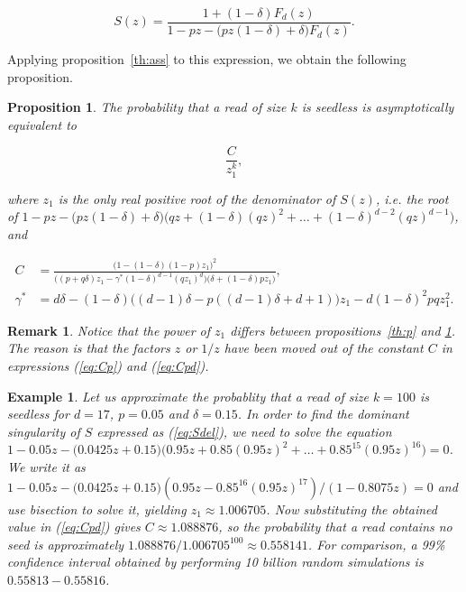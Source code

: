 \documentclass{article}
\newtheorem{example}{Example}
\newtheorem{proposition}{Proposition}
\newtheorem{remark}{Remark}
\begin{document}
\begin{equation}
\label{eq:Sdel}
S(z) = \frac{1+(1-\delta)F_d(z)}
  {1-pz - \big(pz(1-\delta) + \delta\big)F_d(z)}.
\end{equation}

Applying proposition~\ref{th:ass} to this expression, we obtain the
following proposition.

\begin{proposition}
\label{th:pd}
The probability that a read of size $k$ is seedless is asymptotically
equivalent to

\begin{equation*}
\frac{C}{z_1^k},
\end{equation*}

\noindent
where $z_1$ is the only real positive root of the denominator of $S(z)$,
\textit{i.e.} the root of $1-pz - \big(pz(1-\delta) +
\delta\big)\big(qz+(1-\delta)(qz)^2 + \ldots +
(1-\delta)^{d-2}(qz)^{d-1}\big)$, and

\begin{equation}
\label{eq:Cpd}
\begin{split}
C &=
\frac{ \big(1-(1-\delta)(1-p)z_1\big)^2 }
{ \big((p+q\delta)z_1  -\gamma^*(1-\delta)^{d-1}(qz_1)^d \big)
\big(\delta+(1-\delta)pz_1\big) }, \\
\gamma^* &= d\delta -(1-\delta)\big((d-1)\delta-p((d-1)\delta+d+1)\big)z_1
- d(1-\delta)^2pqz_1^2.
\end{split}
\end{equation}
\end{proposition}

\begin{remark}
Notice that the power of $z_1$ differs between propositions~\ref{th:p} and
\ref{th:pd}. The reason is that the factors $z$ or $1/z$ have been moved
out of the constant $C$ in expressions (\ref{eq:Cp}) and (\ref{eq:Cpd}).
\end{remark}

\begin{example}
\label{ex:num2}
Let us approximate the probablity that a read of size $k = 100$ is
seedless for $d=17$, $p = 0.05$ and $\delta = 0.15$. In order to find the
dominant singularity of $S$ expressed as (\ref{eq:Sdel}), we need to solve
the equation $1-0.05z - \big(0.0425z + 0.15\big) \big(0.95z+0.85(0.95z)^2
+ \ldots + 0.85^{15}(0.95z)^{16}\big) = 0$. We write it as $1-0.05z -
\big(0.0425z + 0.15) (0.95z-0.85^{16}(0.95z)^{17}) / (1-0.8075z) = 0$ and
use bisection to solve it, yielding $z_1 \approx 1.006705$. Now
substituting the obtained value in (\ref{eq:Cpd}) gives $C \approx
1.088876$, so the probability that a read contains no seed is
approximately $1.088876 / 1.006705^{100} \approx 0.558141$. For
comparison, a 99\% confidence interval obtained by performing 10 billion
random simulations is $0.55813-0.55816$.
\end{example}
\end{document}
